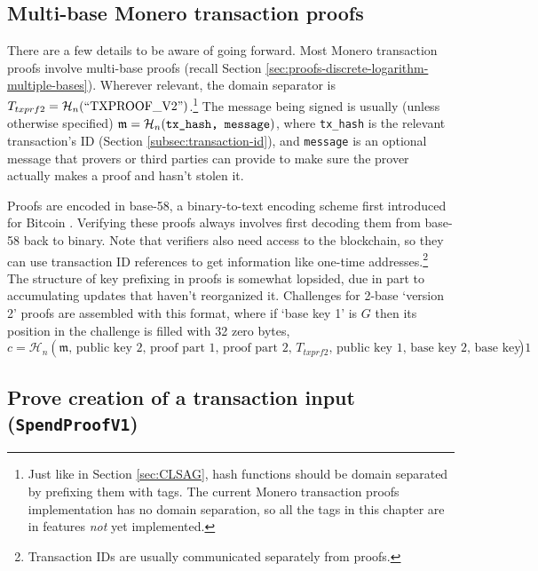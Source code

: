 \subsection{Multi-base Monero transaction proofs}
\label{subsec:proofs-multi-base-monero}

There are a few details to be aware of going forward. Most Monero transaction proofs involve multi-base proofs (recall Section \ref{sec:proofs-discrete-logarithm-multiple-bases}). Wherever relevant, the domain separator is $T_{txprf2} = \mathcal{H}_n(``\textrm{TXPROOF\_V2}")$.\footnote{Just like in Section \ref{sec:CLSAG}, hash functions should be domain separated by prefixing them with tags. The current Monero transaction proofs implementation has no domain separation, so all the tags in this chapter are in features {\em not} yet implemented.} The message being signed is usually (unless otherwise specified) $\mathfrak{m} = \mathcal{H}_n(\texttt{tx\_hash, \texttt{message}})$, where {\tt tx\_hash} is the relevant transaction's ID (Section \ref{subsec:transaction-id}), and {\tt message} is an optional message that provers or third parties can provide to make sure the prover actually makes a proof and hasn't stolen it.

Proofs are encoded in base-58, a binary-to-text encoding scheme first introduced for Bitcoin \cite{base-58-encoding}. Verifying these proofs always involves first decoding them from base-58 back to binary. Note that verifiers also need access to the blockchain, so they can use transaction ID references to get information like one-time addresses.\footnote{Transaction IDs are usually communicated separately from proofs.}
\\

The structure of key prefixing in proofs is somewhat lopsided, due in part to accumulating updates that haven't reorganized it. Challenges for 2-base `version 2' proofs are assembled with this format, where if `base key 1' is $G$ then its position in the challenge is filled with 32 zero bytes,\vspace{.175cm}
\[c = \mathcal{H}_n(\mathfrak{m}\textrm{, public key 2, proof part 1, proof part 2, $T_{txprf2}$, public key 1, base key 2, base key 1})\]


\subsection{Prove creation of a transaction input ({\tt SpendProofV1})}
\label{subsec:proofs-input-creation-spendproof}

